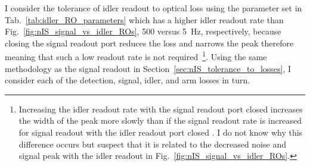 

I consider the tolerance of idler readout to optical loss using the parameter set in Tab.~\ref{tab:idler_RO_parameters} which has a higher idler readout rate than Fig.~\ref{fig:nIS_signal_vs_idler_ROs}, 500 versus 5~Hz, respectively, because closing the signal readout port reduces the loss and narrows the peak therefore meaning that such a low readout rate is not required~\footnote{Increasing the idler readout rate with the signal readout port closed increases the width of the peak more slowly than if the signal readout rate is increased for signal readout with the idler readout port closed . I do not know why this difference occurs but suspect that it is related to the decreased noise and signal peak with the idler readout in Fig.~\ref{fig:nIS_signal_vs_idler_ROs}.}.
Using the same methodology as the signal readout in Section~\ref{sec:nIS_tolerance_to_losses}, I consider each of the detection, signal, idler, and arm losses in turn.

